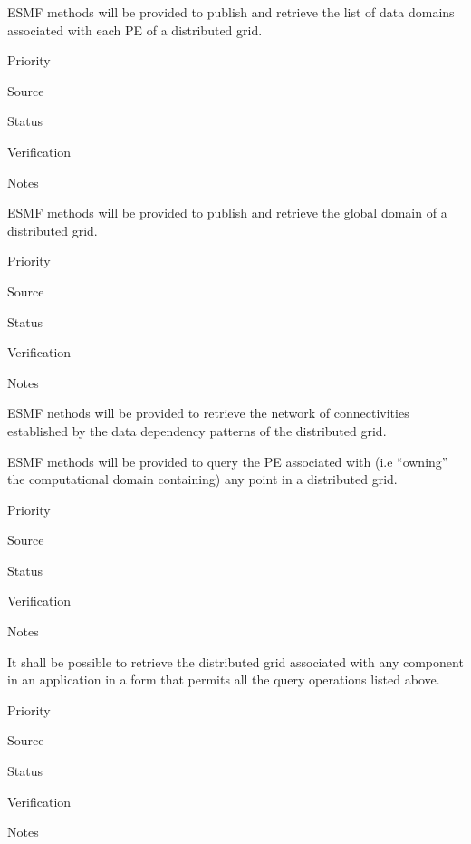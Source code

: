 
ESMF methods will be provided to publish and retrieve the list of
data domains associated with each PE of a distributed grid.

\begin{reqlist}
\item[Priority]
\item[Source]
\item[Status]
\item[Verification]
\item[Notes]
\end{reqlist}


ESMF methods will be provided to publish and retrieve the global
domain of a distributed grid.

\begin{reqlist}
\item[Priority]
\item[Source]
\item[Status]
\item[Verification]
\item[Notes]
\end{reqlist}


ESMF nethods will be provided to retrieve the network of
connectivities established by the data dependency patterns of the
distributed grid.


ESMF methods will be provided to query the PE associated with (i.e
``owning'' the computational domain containing) any point in a
distributed grid.

\begin{reqlist}
\item[Priority]
\item[Source]
\item[Status]
\item[Verification]
\item[Notes]
\end{reqlist}


It shall be possible to retrieve the distributed grid associated with
any component in an application in a form that permits all the query
operations listed above.

\begin{reqlist}
\item[Priority]
\item[Source]
\item[Status]
\item[Verification]
\item[Notes]
\end{reqlist}

